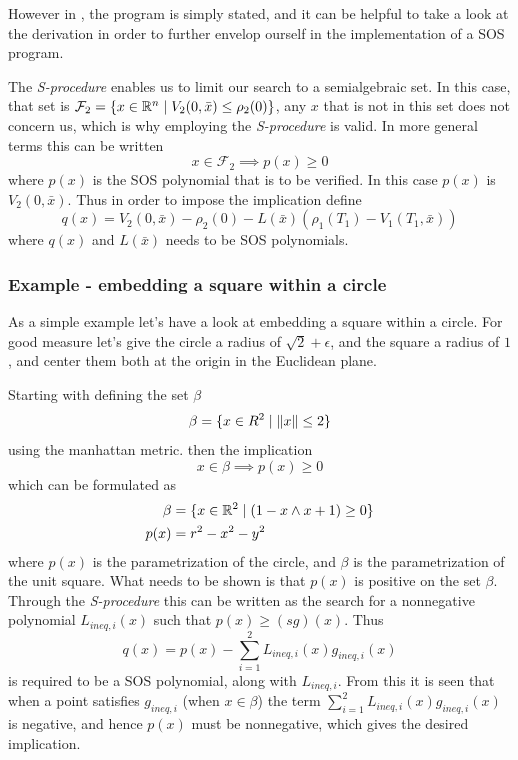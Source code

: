 However in \cite[Majumdar and Tedrake]{majumdarFunnelLibrariesRealtime2017}, the
program is simply stated, and it can be helpful to take a look at the derivation
in order to further envelop ourself in the implementation of a \ac{SOS} program.

The \textit{S-procedure} enables us to limit our search to a semialgebraic set.
In this case, that set is \(\mathcal{F}_2 = \lbrace x \in \mathbb{R}^n \mid V_2(0,\bar{x})
  \leq \rho_2(0)\rbrace\), any \(x\) that is not in this set does not concern us,
which is why employing the \textit{S-procedure} is valid. In more general terms
this can be written
\[
  x \in \mathcal{F}_2 \implies p(x) \geq 0
\]
where \(p(x)\) is the \ac{SOS} polynomial that is to be verified. In this case
\(p(x)\) is \(V_2(0,\bar{x})\). Thus in order to impose the implication define
\[
  q(x) = V_2(0,\bar{x}) - \rho_2(0) - L(\bar{x}) \left( \rho_1(T_1) -
    V_1(T_1,\bar{x}) \right)
\]
where \(q(x)\) and \(L(\bar{x})\) needs to be SOS polynomials.

\subsubsection{Example - embedding a square within a circle}

As a simple example let's have a look at embedding a square within a circle. For
good measure let's give the circle a radius of \(\sqrt{2}+\epsilon\), and the square a
radius of \(1\), and center them both at the origin in the Euclidean plane.

Starting with defining the set \(\beta\)
\[
  \beta = \lbrace x \in R^2 \mid \lVert x\rVert \leq 2\rbrace
\]
using the manhattan metric. then the implication
\[
  x \in \beta \implies p(x) \geq 0
\]
which can be formulated as
\begin{align*}
  \beta &= \lbrace x \in \mathbb{R}^2 \mid (1 - x \wedge x + 1) \geq 0\rbrace \\
  p(x) &= r^2 - x^2 - y^2
\end{align*}
where \(p(x)\) is the parametrization of the circle, and \(\beta\) is the
parametrization of the unit square. What needs to be shown is that \(p(x)\) is
positive on the set \(\beta\). Through the \textit{S-procedure} this can be
written as the search for a nonnegative polynomial \(L_{ineq,i}(x)\) such that
\(p(x) \geq \left( sg \right)(x)\). Thus
\[
  q(x) = p(x) - \sum_{i=1}^{2}L_{ineq,i}(x)g_{ineq,i}(x)
\]
is required to be a \ac{SOS} polynomial, along with \(L_{ineq,i}\). From this it
is seen that when a point satisfies \(g_{ineq,i}\) (\ie when \(x \in \beta\))
the term \(\sum_{i=1}^{2}L_{ineq,i}(x)g_{ineq,i}(x)\) is negative, and hence
\(p(x)\) must be nonnegative, which gives the desired implication.

